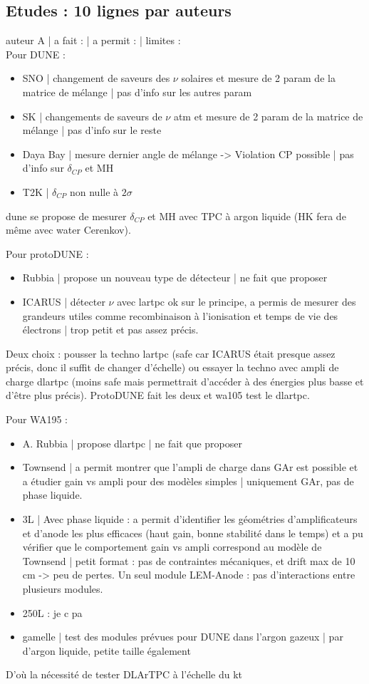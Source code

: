 \subsection{Etudes : 10 lignes par auteurs}
auteur A | a fait : | a permit : | limites :\\
Pour DUNE :\\
\begin{itemize}
	\item SNO | changement de saveurs des $\nu$ solaires et mesure de 2 param de la matrice de mélange | pas d'info sur les autres param 
	\item SK | changements de saveurs de $\nu$ atm et mesure de 2 param de la matrice de mélange | pas d'info sur le reste
	\item Daya Bay | mesure dernier angle de mélange -> Violation CP possible | pas d'info sur $\delta_{CP}$ et MH
	\item T2K | $\delta_{CP}$ non nulle à $2\sigma$
\end{itemize}
\gls{dune} se propose de mesurer $\delta_{CP}$ et MH avec TPC à argon liquide (HK fera de même avec water Cerenkov).

Pour protoDUNE : 
\begin{itemize}
	\item Rubbia | propose un nouveau type de détecteur | ne fait que proposer
	\item ICARUS | détecter $\nu$ avec \gls{lartpc} ok sur le principe, a permis de mesurer des grandeurs utiles comme recombinaison à l'ionisation et temps de vie des électrons | trop petit et pas assez précis. 
\end{itemize}
Deux choix : pousser la techno \gls{lartpc} (safe car ICARUS était presque assez précis, donc il suffit de changer d'échelle) ou essayer la techno avec ampli de charge \gls{dlartpc} (moins safe mais permettrait d'accéder à des énergies plus basse et d'être plus précis). ProtoDUNE fait les deux et \gls{wa105} test le \gls{dlartpc}.

Pour WA195 :
\begin{itemize}
	\item A. Rubbia | propose \gls{dlartpc} | ne fait que proposer
	\item Townsend | a permit montrer que l'ampli de charge dans GAr est possible et a étudier gain vs ampli pour des modèles simples | uniquement GAr, pas de phase liquide.
	\item 3L | Avec phase liquide : a permit d'identifier les géométries d'amplificateurs et d'anode les plus efficaces (haut gain, bonne stabilité dans le temps) et a pu vérifier que le comportement gain vs ampli correspond au modèle de Townsend | petit format : pas de contraintes mécaniques, et drift max de 10 cm -> peu de pertes. Un seul module LEM-Anode : pas d'interactions entre plusieurs modules.
	\item 250L : je c pa
	\item gamelle | test des modules prévues pour DUNE dans l'argon gazeux | par d'argon liquide, petite taille également
\end{itemize}
D'où la nécessité de tester DLArTPC à l'échelle du kt

